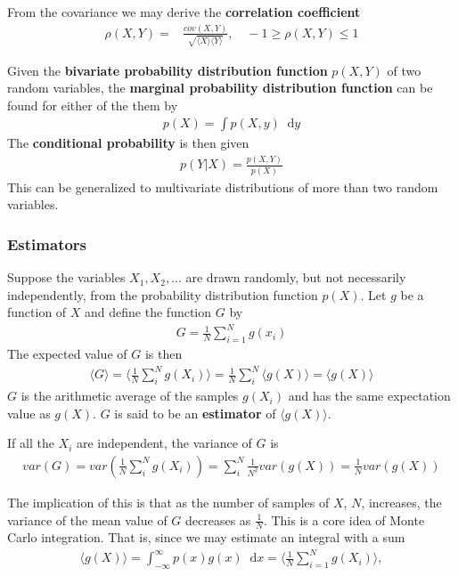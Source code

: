 \documentclass[twoside,english]{uiofysmaster}
\newcommand*\dif{\mathop{}\!\mathrm{d}}
\begin{document}
From the covariance we may derive the \textbf{correlation coefficient}
\begin{align}
	\rho(X,Y) =& \frac{cov(X,Y)}{\sqrt{ \langle X \rangle \langle Y \rangle }}, \quad
	-1 \geq \rho(X,Y) \leq 1
\end{align}

Given the \textbf{bivariate probability distribution function} $p(X,Y)$ of two random variables, the \textbf{marginal probability distribution function} can be found for either of the them by 
\begin{align}
	p(X) = \int p(X,y) \dif y
\end{align}
The \textbf{conditional probability} is then given
\begin{align}
	p(Y|X) = \frac{p(X,Y)}{p(X)}
\end{align}
This can be generalized to multivariate distributions of more than two random variables.


\subsubsection{Estimators}
Suppose the variables $X_1, X_2,...$ are drawn randomly, but not necessarily independently, from the probability distribution function $p(X)$. Let $g$ be a function of $X$ and define the function $G$ by
\begin{align}
	G = \frac{1}{N} \sum_{i=1}^N g(x_i)
\end{align}
The expected value of $G$ is then
\begin{align}
	\langle G \rangle = \langle \frac{1}{N} \sum_i^N g(X_i) \rangle = \frac{1}{N} \sum_i^N \langle g(X) \rangle = \langle g(X) \rangle
\end{align} 
$G$ is the arithmetic average of the samples $g(X_i)$ and has the same expectation value as $g(X)$. $G$ is said to be an \textbf{estimator} of $\langle g(X) \rangle$. 

If all the $X_i$ are independent, the variance of $G$ is
\begin{align}
	var(G) = var( \frac{1}{N} \sum_i^N g(X_i)  ) = \sum_i^N \frac{1}{N^2} var(g(X)) 
	= \frac{1}{N} var(g(X))
\end{align}

The implication of this is that as the number of samples of $X$, $N$, increases, the variance of the mean value of $G$ decreases as $\frac{1}{N}$. This is a core idea of Monte Carlo integration. That is, since we may estimate an integral with a sum
\begin{align}
	\langle g(X) \rangle = \int_{-\infty}^\infty p(x) g(x) \dif x = \langle \frac{1}{N} \sum_{i=1}^N g(X_i) \rangle,
\end{align}
\end{document}

